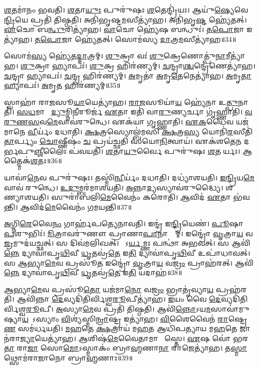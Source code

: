 \ul{𑌶}𑌤𑌮𑌾॑𑌨𑌂 𑌭𑌵𑌤𑌿।
\ul{𑌶}𑌤𑌾\ul{𑌯𑍁𑌃} 𑌪𑍁𑌰𑍁॑𑌷𑌃 \ul{𑌶}𑌤𑍇𑌨𑍍𑌦𑍍𑌰𑌿॑𑌯𑌃।
𑌆𑌯𑍁॑\ul{𑌷𑍍𑌯𑍇}𑌵𑍇\ul{𑌨𑍍𑌦𑍍𑌰𑌿}𑌯𑍇 𑌪𑍍𑌰𑌤𑌿॑ 𑌤𑌿𑌷𑍍𑌠𑌤𑌿।
𑌅𑌨𑌿॑𑌭𑍃𑌷𑍍𑌟\ul{𑌮}𑌸𑍀𑌤𑍍𑌯𑌾॑𑌹।
𑌅𑌨𑌿॑𑌭𑍃\ul{𑌷𑍍𑌟}\ul{} 𑌹𑍍𑌯𑍇॑𑌤𑌤𑍍।
\ul{𑌵𑌾}𑌚𑍋 𑌬\ul{𑌨𑍍𑌧𑍁}𑌰𑌿𑌤𑍍𑌯𑌾॑𑌹।
\ul{𑌵𑌾}𑌚𑍋 𑌹𑍍𑌯𑍇॑𑌷 𑌬𑌨𑍍𑌧𑍁𑌃॑।
\ul{𑌤}\ul{𑌪𑍋}𑌜𑌾 𑌇𑌤𑍍𑌯𑌾॑𑌹।
\ul{𑌤}\ul{𑌪𑍋}𑌜𑌾 𑌹𑍍𑌯𑍇॑𑌤𑌤𑍍।
𑌸𑍋𑌮॑𑌸𑍍𑌯 \ul{𑌦𑌾}𑌤𑍍𑌰\ul{𑌮}𑌸𑍀𑌤𑍍𑌯𑌾॑𑌹॥34॥

𑌸𑍋𑌮॑\ul{𑌸𑍍𑌯} 𑌹𑍍𑌯𑍇॑𑌤\ul{𑌦𑍍𑌦𑌾}𑌤𑍍𑌰𑌮𑍍।
\ul{𑌶𑍁}𑌕𑍍𑌰𑌾 𑌵𑌃॑ \ul{𑌶𑍁}𑌕𑍍𑌰𑍇𑌣𑍋𑌤𑍍𑌪𑍁॑\ul{𑌨𑌾}𑌮𑍀𑌤𑍍𑌯𑌾॑𑌹।
\ul{𑌶𑍁}𑌕𑍍𑌰𑌾 𑌹𑍍𑌯𑌾𑌪𑌃॑।
\ul{𑌶𑍁}𑌕𑍍𑌰 𑌹𑌿𑌰॑𑌣𑍍𑌯𑌮𑍍।
\ul{𑌚}𑌨𑍍𑌦𑍍𑌰𑌾\ul{𑌶𑍍𑌚}𑌨𑍍𑌦𑍍𑌰𑍇𑌣𑍇𑌤𑍍𑌯𑌾॑𑌹।
\ul{𑌚}𑌨𑍍𑌦𑍍𑌰𑌾 𑌹𑍍𑌯𑌾𑌪𑌃॑।
\ul{𑌚}𑌨𑍍𑌦𑍍𑌰 𑌹𑌿𑌰॑𑌣𑍍𑌯𑌮𑍍।
\ul{𑌅}𑌮𑍃𑌤𑌾॑ \ul{𑌅}𑌮𑍃\ul{𑌤𑍇}𑌨𑍇𑌤𑍍𑌯𑌾॑𑌹।
\ul{𑌅}𑌮𑍃\ul{𑌤𑌾} 𑌹𑍍𑌯𑌾𑌪𑌃॑।
\ul{𑌅}𑌮𑍃\ul{𑌤}\ul{} 𑌹𑌿𑌰॑𑌣𑍍𑌯𑌮𑍍॥35॥

𑌸𑍍𑌵𑌾𑌹𑌾॑ 𑌰𑌾\ul{𑌜}𑌸𑍂\ul{𑌯𑌾}𑌯𑍇𑌤𑍍𑌯𑌾॑𑌹।
\ul{𑌰𑌾}\ul{𑌜}𑌸𑍂𑌯𑌾॑\ul{𑌯} 𑌹𑍍𑌯𑍇॑𑌨𑌾 𑌉\ul{𑌤𑍍𑌪𑍁}𑌨𑌾𑌤𑌿॑।
\ul{𑌸}\ul{𑌧}𑌮𑌾𑌦𑍋᳚ \ul{𑌦𑍍𑌯𑍁}𑌮𑍍𑌨𑌿\ul{𑌨𑍀}𑌰𑍂𑌰𑍍𑌜॑ \ul{𑌏}𑌤𑌾 𑌇𑌤𑌿॑ 𑌵𑌾\ul{𑌰𑍁}𑌣𑍍𑌯𑌰𑍍𑌚𑌾 𑌗𑍃॑𑌹𑍍𑌣𑌾𑌤𑌿।
\ul{𑌵}\ul{𑌰𑍁}\ul{𑌣}\ul{𑌸}𑌵\ul{𑌮𑍇}𑌵𑌾𑌵॑𑌰𑍁𑌨𑍍𑌧𑍇।
𑌏𑌕॑𑌯𑌾 𑌗𑍃𑌹𑍍𑌣𑌾𑌤𑌿।
\ul{𑌏}\ul{𑌕}𑌧𑍈𑌵 𑌯𑌜॑𑌮𑌾𑌨𑍇 \ul{𑌵𑍀}𑌰𑍍𑌯𑌂॑ 𑌦𑌧𑌾𑌤𑌿।
\ul{𑌕𑍍𑌷}𑌤𑍍𑌰𑌸𑍍𑌯𑍋𑌲𑍍𑌬॑𑌮𑌸𑌿 \ul{𑌕𑍍𑌷}𑌤𑍍𑌰\ul{𑌸𑍍𑌯} 𑌯𑍋𑌨𑌿॑\ul{𑌰}𑌸𑍀𑌤𑌿॑ \ul{𑌤𑌾}𑌰𑍍𑌪𑍍𑌯𑌂 \ul{𑌚𑍋}𑌷𑍍𑌣𑍀𑌷𑌂॑ \ul{𑌚} 𑌪𑍍𑌰𑌯॑𑌚𑍍𑌛𑌤𑌿 𑌸𑌯𑍋\ul{𑌨𑌿}𑌤𑍍𑌵𑌾𑌯॑।
𑌏𑌕॑𑌶𑌤𑍇𑌨 𑌦𑌰𑍍𑌭𑌪𑍁\ul{𑌞𑍍𑌜𑍀}𑌲𑍈𑌃 𑌪॑𑌵𑌯𑌤𑌿।
\ul{𑌶}𑌤𑌾\ul{𑌯𑍁}𑌰𑍍𑌵𑍈 𑌪𑍁𑌰𑍁॑𑌷𑌃 \ul{𑌶}𑌤𑌵𑍀᳚𑌰𑍍𑌯𑌃।
\ul{𑌆}𑌤𑍍𑌮𑍈𑌕॑\ul{𑌶}𑌤𑌃॥36॥

𑌯𑌾𑌵𑌾॑\ul{𑌨𑍇}𑌵 𑌪𑍁𑌰𑍁॑𑌷𑌃।
𑌤𑌸𑍍𑌮𑌿॑\ul{𑌨𑍍𑌵𑍀}𑌰𑍍𑌯𑌂॑ 𑌦𑌧𑌾𑌤𑌿।
𑌦𑌧𑍍𑌯𑌾॑𑌶𑌯𑌤𑌿।
\ul{𑌇}\ul{𑌨𑍍𑌦𑍍𑌰𑌿}𑌯\ul{𑌮𑍇}𑌵𑌾𑌵॑ 𑌰𑍁𑌨𑍍𑌧𑍇।
\ul{𑌉}\ul{𑌦𑍁}𑌮𑍍𑌬𑌰॑𑌮𑌾𑌶𑌯𑌤𑌿।
\ul{𑌅}𑌨𑍍𑌨𑌾\ul{𑌦𑍍𑌯}𑌸𑍍𑌯𑌾𑌵॑𑌰𑍁𑌦𑍍𑌧𑍍𑌯𑍈।
𑌶𑌷𑍍𑌪𑌾᳚𑌣𑍍𑌯𑌾𑌶𑌯𑌤𑌿।
𑌸𑍁𑌰𑌾॑𑌬𑌲𑌿\ul{𑌮𑍇}𑌵𑍈𑌨𑌂॑ 𑌕𑌰𑍋𑌤𑌿।
\ul{𑌆}𑌵𑌿𑌦॑ \ul{𑌏}𑌤𑌾 𑌭॑𑌵𑌨𑍍𑌤𑌿।
\ul{𑌆}𑌵𑌿𑌦॑\ul{𑌮𑍇}𑌵𑍈𑌨𑌂॑ 𑌗𑌮𑌯𑌨𑍍𑌤𑌿॥37॥

\ul{𑌅}𑌗𑍍𑌨𑌿\ul{𑌰𑍇}𑌵𑍈\ul{𑌨𑌂} 𑌗𑌾𑌰𑍍\mbox{}𑌹॑𑌪𑌤𑍍𑌯𑍇𑌨𑌾𑌵𑌤𑌿।
𑌇𑌨𑍍𑌦𑍍𑌰॑ 𑌇\ul{𑌨𑍍𑌦𑍍𑌰𑌿}𑌯𑍇𑌣॑।
\ul{𑌪𑍂}𑌷𑌾 \ul{𑌪}𑌶𑍁𑌭𑌿𑌃॑।
\ul{𑌮𑌿}𑌤𑍍𑌰𑌾𑌵𑌰𑍁॑𑌣𑍗 𑌪𑍍𑌰𑌾𑌣𑌾\ul{𑌪𑌾}𑌨𑌾𑌭𑍍𑌯𑌾᳚𑌮𑍍।
𑌇𑌨𑍍𑌦𑍍𑌰𑍋॑ \ul{𑌵𑍃}𑌤𑍍𑌰𑌾\ul{𑌯} 𑌵\ul{𑌜𑍍𑌰}𑌮𑍁𑌦॑𑌯𑌚𑍍𑌛𑌤𑍍।
𑌸 𑌦𑌿𑌵॑𑌮𑌲𑌿𑌖𑌤𑍍।
𑌸𑍋᳚𑌽\ul{𑌰𑍍𑌯}𑌮𑍍𑌣𑌃 𑌪𑌨𑍍𑌥𑌾॑ 𑌅𑌭𑌵𑌤𑍍।
𑌸 𑌆𑌵𑌿॑\ul{𑌨𑍍𑌨𑍇} 𑌦𑍍𑌯𑌾𑌵𑌾॑𑌪𑍃\ul{𑌥𑌿}𑌵𑍀 \ul{𑌧𑍃}𑌤𑌵𑍍𑌰॑\ul{𑌤𑍇} 𑌇\ul{𑌤𑌿} 𑌦𑍍𑌯𑌾𑌵𑌾॑𑌪𑍃\ul{𑌥𑌿}𑌵𑍀 𑌉𑌪𑌾॑𑌧𑌾𑌵𑌤𑍍।
𑌸 \ul{𑌆}𑌭𑍍𑌯𑌾\ul{𑌮𑍇}𑌵 𑌪𑍍𑌰𑌸𑍂॑\ul{𑌤} 𑌇𑌨𑍍𑌦𑍍𑌰𑍋॑ \ul{𑌵𑍃}𑌤𑍍𑌰𑌾\ul{𑌯} 𑌵\ul{𑌜𑍍𑌰𑌂} 𑌪𑍍𑌰𑌾𑌹॑𑌰𑌤𑍍।
𑌆𑌵𑌿॑\ul{𑌨𑍍𑌨𑍇} 𑌦𑍍𑌯𑌾𑌵𑌾॑𑌪𑍃\ul{𑌥𑌿}𑌵𑍀 \ul{𑌧𑍃}𑌤𑌵𑍍𑌰॑\ul{𑌤𑍇} 𑌇\ul{𑌤𑌿} 𑌯𑌦𑌾𑌹॑॥38॥

\ul{𑌆}𑌭𑍍𑌯𑌾\ul{𑌮𑍇}𑌵 𑌪𑍍𑌰𑌸𑍂॑\ul{𑌤𑍋} 𑌯𑌜॑𑌮𑌾\ul{𑌨𑍋} 𑌵\ul{𑌜𑍍𑌰𑌂} 𑌭𑍍𑌰𑌾𑌤𑍃॑𑌵𑍍𑌯𑌾\ul{𑌯} 𑌪𑍍𑌰𑌹॑𑌰𑌤𑌿।
𑌆𑌵𑌿॑𑌨𑍍𑌨𑌾 \ul{𑌦𑍇}𑌵𑍍𑌯𑌦𑌿॑𑌤𑌿𑌰𑍍𑌵𑌿𑌶𑍍𑌵\ul{𑌰𑍂}𑌪𑍀𑌤𑍍𑌯𑌾॑𑌹।
\ul{𑌇}𑌯𑌂 𑌵𑍈 \ul{𑌦𑍇}𑌵𑍍𑌯𑌦𑌿॑𑌤𑌿𑌰𑍍𑌵𑌿𑌶𑍍𑌵\-\ul{𑌰𑍂}𑌪𑍀।
\ul{𑌅}𑌸𑍍𑌯𑌾\ul{𑌮𑍇}𑌵 𑌪𑍍𑌰𑌤𑌿॑ 𑌤𑌿𑌷𑍍𑌠𑌤𑌿।
𑌆𑌵𑌿॑\ul{𑌨𑍍𑌨𑍋}\-𑌽𑌯\ul{𑌮}𑌸𑌾𑌵𑌾॑𑌮𑍁𑌷𑍍𑌯𑌾\-\ul{𑌯}𑌣𑍋᳚\-𑌽𑌸𑍍𑌯𑌾𑌂 \ul{𑌵𑌿}𑌶𑍍𑌯॑𑌸𑍍𑌮𑌿\ul{𑌨𑍍𑌰𑌾}𑌷𑍍𑌟𑍍𑌰 𑌇𑌤𑍍𑌯𑌾॑𑌹।
\ul{𑌵𑌿}𑌶𑍈𑌵𑍈𑌨॑ \ul{𑌰𑌾}𑌷𑍍𑌟𑍍𑌰𑍇\ul{𑌣} 𑌸𑌮॑𑌰𑍍𑌧𑌯𑌤𑌿।
\ul{𑌮}\ul{𑌹}𑌤𑍇 \ul{𑌕𑍍𑌷}𑌤𑍍𑌰𑌾𑌯॑ 𑌮\ul{𑌹}𑌤 𑌆𑌧𑌿॑𑌪𑌤𑍍𑌯𑌾𑌯 𑌮\ul{𑌹}𑌤𑍇 𑌜𑌾𑌨॑𑌰𑌾\ul{𑌜𑍍𑌯𑌾}𑌯𑍇𑌤𑍍𑌯𑌾॑𑌹।
\ul{𑌆}𑌶𑌿𑌷॑\ul{𑌮𑍇}𑌵𑍈𑌤𑌾𑌮𑌾 𑌶𑌾᳚𑌸𑍍𑌤𑍇।
\ul{𑌏}𑌷 𑌵𑍋॑ 𑌭𑌰\ul{𑌤𑌾} 𑌰𑌾\ul{𑌜𑌾} 𑌸𑍋\ul{𑌮𑍋}\-𑌽𑌸𑍍𑌮𑌾𑌕𑌂॑ 𑌬𑍍𑌰𑌾\ul{𑌹𑍍𑌮}𑌣𑌾\ul{𑌨𑌾}\ul{} 𑌰𑌾𑌜𑍇𑌤𑍍𑌯𑌾॑𑌹।
𑌤\ul{𑌸𑍍𑌮𑌾}𑌥𑍍𑌸𑍋𑌮॑𑌰𑌾𑌜𑌾𑌨𑍋 𑌬𑍍𑌰𑌾\ul{𑌹𑍍𑌮}𑌣𑌾𑌃॥39॥

